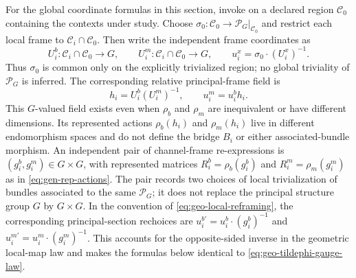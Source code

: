 For the global coordinate formulas in this section, invoke
 on a declared region
\(\mathcal C_0\) containing the contexts under study. Choose
\(\sigma_0:\mathcal C_0\to \mathscr P_G|_{\mathcal C_0}\) and restrict each local frame
to \(\mathcal C_i\cap\mathcal C_0\). Then write the independent frame
coordinates as
\begin{equation}
U_i^b:\mathcal C_i\cap\mathcal C_0\to G,
\qquad
U_i^m:\mathcal C_i\cap\mathcal C_0\to G,
\qquad
u_i^x=\sigma_0\cdot(U_i^x)^{-1}.
\label{eq:gen-frames}
\end{equation}
Thus $\sigma_0$ is common only on the explicitly trivialized region; no
global triviality of \(\mathscr P_G\) is inferred. The corresponding
relative principal-frame field is
\begin{equation}
h_i=U_i^b(U_i^m)^{-1},
\qquad
u_i^m=u_i^b h_i.
\label{eq:gen-relative-principal-frame}
\end{equation}
This $G$-valued field exists even when $\rho_b$ and $\rho_m$ are inequivalent
or have different dimensions. Its represented actions $\rho_b(h_i)$ and
$\rho_m(h_i)$ live in different endomorphism spaces and do not define the
bridge $B_i$ or either associated-bundle morphism.
An independent pair of channel-frame re-expressions is
$(g_i^b,g_i^m)\in G\times G$, with represented matrices
$R_i^b=\rho_b(g_i^b)$ and $R_i^m=\rho_m(g_i^m)$ as in
\eqref{eq:gen-rep-actions}. The pair records two choices of local
trivialization of bundles associated to the same $\mathscr P_G$; it does not replace the
principal structure group $G$ by $G\times G$.
In the convention of \eqref{eq:geo-local-reframing}, the corresponding
principal-section rechoices are
$u_i^{b\prime}=u_i^b\cdot(g_i^b)^{-1}$ and
$u_i^{m\prime}=u_i^m\cdot(g_i^m)^{-1}$. This accounts for the opposite-sided
inverse in the geometric local-map law and makes the formulas below identical
to \eqref{eq:geo-tildephi-gauge-law}.

